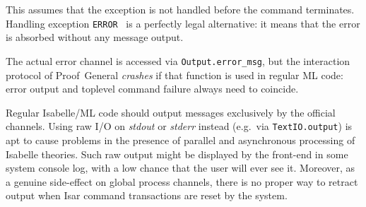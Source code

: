 \begin{isabellebody}
\begin{isamarkuptext}
\begin{description}
  This assumes that the exception is not handled before the command
  terminates.  Handling exception \verb|ERROR|~ is a
  perfectly legal alternative: it means that the error is absorbed
  without any message output.

  \begin{warn}
  The actual error channel is accessed via \verb|Output.error_msg|, but
  the interaction protocol of Proof~General \emph{crashes} if that
  function is used in regular ML code: error output and toplevel
  command failure always need to coincide.
  \end{warn}

  \end{description}

  \begin{warn}
  Regular Isabelle/ML code should output messages exclusively by the
  official channels.  Using raw I/O on \emph{stdout} or \emph{stderr}
  instead (e.g.\ via \verb|TextIO.output|) is apt to cause problems in
  the presence of parallel and asynchronous processing of Isabelle
  theories.  Such raw output might be displayed by the front-end in
  some system console log, with a low chance that the user will ever
  see it.  Moreover, as a genuine side-effect on global process
  channels, there is no proper way to retract output when Isar command
  transactions are reset by the system.
  \end{warn}


\end{isamarkuptext}
\end{isabellebody}
